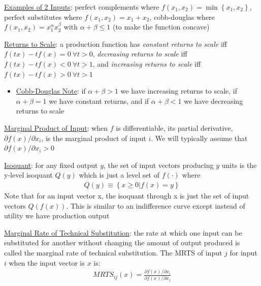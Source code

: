 \documentclass{article}
\begin{document}
  \par
  \underline{Examples of 2 Inputs}: perfect complements where $f(x_{1}, x_{2}) = \min \left\{ x_{1}, x_{2} \right\}$, perfect substitutes where $f(x_{1}, x_{2}) = x_{1} + x_{2}$, cobb-douglas where $f(x_{1}, x_{2}) = x_{1}^{\alpha}x_{2}^{\beta}$ with $\alpha + \beta \leq 1$ (to make the function concave)
  \par
  \underline{Returns to Scale}: a production function has \textit{constant returns to scale} iff $f(tx) - tf(x) = 0 \ \forall t > 0$, \textit{decreasing returns to scale} iff $f(tx) - tf(x) < 0 \ \forall t > 1$, and \textit{increasing returns to scale} iff $f(tx) - tf(x) > 0 \ \forall t > 1$
  \begin{itemize}
    \item  \underline{Cobb-Douglas Note}: if $\alpha + \beta > 1$ we have increasing returns to scale, if $\alpha + \beta = 1$ we have constant returns, and if $\alpha + \beta < 1$ we have decreasing returns to scale
  \end{itemize}
  \par
  \underline{Marginal Product of Input}: when $f$ is differentiable, its partial derivative, $\partial f(x) / \partial x_{i}$, is the marginal product of input $i$. We will typically assume that $\partial f(x) / \partial x_{i} > 0$
  \par
  \underline{Isoquant}: for any fixed output $y$, the set of input vectors producing $y$ units is the y-level isoquant $Q(y)$ which is just a level set of $f(\cdot)$ where
  \begin{gather*}
    Q(y) \equiv \left\{ x \geq 0 | f(x) = y \right\}
  \end{gather*}
  Note that for an input vector x, the isoquant through x is just the set of input vectors $Q(f(x))$. This is similar to an indifference curve except instead of utility we have production output
  \par
  \underline{Marginal Rate of Technical Substitution}: the rate at which one input can be substituted for another without changing the amount of output produced is called the marginal rate of technical substitution. The MRTS of input $j$ for input $i$ when the input vector is $x$ is:
  \begin{gather*}
    MRTS_{ij}(x) = \frac{\partial f(x) / \partial x_{i}}{\partial f(x) / \partial x_{j}}
  \end{gather*}
\end{document}
